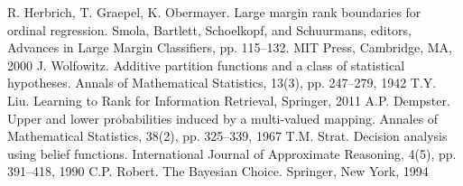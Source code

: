 \documentclass[12pt,a4paper,oneside]{article}
\begin{document}
\begin{multicols}{2}

\begin{footnotesize}
\begin{thebibliography}{9}
	 R. Herbrich, T. Graepel, K. Obermayer. Large margin rank boundaries for ordinal regression. Smola, Bartlett, Schoelkopf, and Schuurmans, editors, Advances in Large Margin Classifiers, pp. 115–132. MIT Press, Cambridge, MA, 2000%
	 J. Wolfowitz. Additive partition functions and a class of statistical hypotheses. Annals of Mathematical Statistics, 13(3), pp. 247–279, 1942%
	 T.Y. Liu. Learning to Rank for Information Retrieval, Springer, 2011%
	 A.P. Dempster. Upper and lower probabilities induced by a multi-valued mapping. Annales of Mathematical Statistics, 38(2), pp. 325–339, 1967%
	 T.M. Strat. Decision analysis using belief functions. International Journal of Approximate Reasoning, 4(5), pp. 391–418, 1990%
	 C.P. Robert. The Bayesian Choice. Springer, New York, 1994%
\end{thebibliography}
\end{footnotesize}

\end{multicols}
\end{document}
